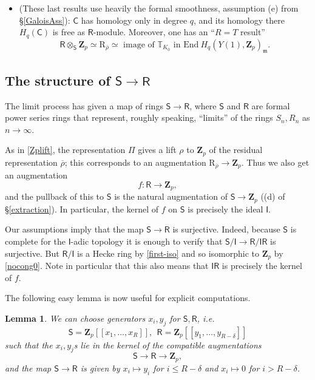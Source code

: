 \documentclass[10pt]{amsart}
\newcommand{\Z}{\mathbf{Z}}
\newcommand{\defring}{\mathrm{R}_{\rhobar}}
\newcommand{\rhobar}{\overline{\rho}}
\newcommand{\End}{\mathrm{End}}
\newcommand{\Cinf}{\mathsf{C}}
\newcommand{\Sinf}{\mathsf{S}}
\newcommand{\Iinf}{\mathsf{I}}
\newcommand{\Rinf}{\mathsf{R}}
\newtheorem{lemma}[subsection]{Lemma}
\theoremstyle{remark}
\begin{document}
\begin{itemize}
  

\item[(g)]

(These last results use heavily the formal smoothness, assumption (e) from  \S \ref{GaloisAss}):
 $\Cinf$  has homology only in degree $q$, and its homology there $H_q(\Cinf)$ is free   as $\Rinf$-module. Moreover, one has 
an ``$R=T$ result''
\begin{equation} \label{first-iso} \Rinf \otimes_{\Sinf} \Z_p \simeq \defring \simeq \mbox{ image of $\mathbb{T}_{K_0} $ in  $\End \ H_q(Y(1), \Z_p)_{\mathfrak{m}}$}. \end{equation}
%
 \end{itemize}
 
 
  
 \subsection{The structure of $\Sinf \rightarrow \Rinf$} \label{SR} 
 
 The limit process has given a map of rings $\Sinf \rightarrow \Rinf$, 
 where $\Sinf$ and $\Rinf$ are formal power series rings that represent, roughly speaking,
 ``limits'' of the rings $S_n, R_n$ as $n \rightarrow \infty$. 
  
As in \eqref{Zplift}, the  representation $\Pi$ gives a lift $\rho$ to $\Z_p$ of the residual representation $\rhobar$;
 this corresponds to an augmentation $\defring \rightarrow \Z_p$.  
Thus we also get an augmentation $$f: \Rinf \rightarrow \Z_p,$$
and the pullback of this to $\Sinf$ is the natural augmentation of $\Sinf \rightarrow \Z_p$ ((d) of \S \ref{extraction}).
In particular, the kernel of $f$ on $\Sinf$ is precisely the ideal
$\Iinf$. 
 
 
 Our assumptions imply that the map $\Sinf \rightarrow \Rinf$ is surjective.
 Indeed, because $\Sinf$ is complete for the $\Iinf$-adic topology
 it is enough to verify that $\Sinf/\Iinf \rightarrow \Rinf/\Iinf \Rinf$
 is surjective.  But
 $\Rinf/\Iinf$ is a Hecke ring by \eqref{first-iso} and so isomorphic to $\Z_p$
 by \eqref{nocong0}. 
  Note in particular that this also means that $\Iinf \Rinf$ is precisely the kernel of $f$. 
 
 
 The following easy  lemma is now useful for explicit computations. 
 
 \begin{lemma} \label{straightening} We can choose generators  $x_i, y_j$ for $\Sinf, \Rinf$, i.e.
  $$\Sinf = \Z_p[[x_1, \dots, x_R]],  \ \ \Rinf = \Z_p[[y_1, \dots, y_{R-\delta}]]$$ 
 such that the $x_i, y_j$s lie in the kernel of the compatible augmentations 
 $$\Sinf \rightarrow \Rinf \rightarrow \Z_p,$$  and 
the map $\Sinf \rightarrow \Rinf$  is given by $x_i \mapsto y_i$ for $i \leq R-\delta$ and $x_i \mapsto 0 $ for $i > R-\delta$. 
 \end{lemma}
\end{document}
